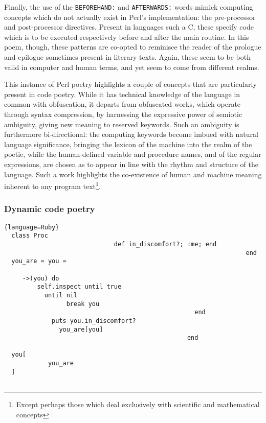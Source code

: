 \documentclass{article}
\begin{document}
Finally, the use of the \lstinline{BEFOREHAND:} and \lstinline{AFTERWARDS:} words mimick computing concepts which do not actually exist in Perl's implementation: the pre-processor and post-processor directives. Present in languages such a C, these specify code which is to be executed respectively before and after the main routine. In this poem, though, these patterns are co-opted to reminisce the reader of the prologue and epilogue sometimes present in literary texts. Again, these seem to be both valid in computer and human terms, and yet seem to come from different realms.

This instance of Perl poetry highlights a couple of concepts that are particularly present in code poetry. While it has technical knowledge of the language in common with obfuscation, it departs from obfuscated works, which operate through syntax compression, by harnessing the expressive power of semiotic ambiguity, giving new meaning to reserved keywords. Such an ambiguity is furthermore bi-directional: the computing keywords become imbued with natural language significance, bringing the lexicon of the machine into the realm of the poetic, while the human-defined variable and procedure names, and of the regular expressions, are chosen as to appear in line with the rhythm and structure of the language. Such a work highlights the co-existence of human and machine meaning inherent to any program text\footnote{Except perhaps those which deal exclusively with scientific and mathematical concepts}.

\pagebreak

\subsubsection{Dynamic code poetry}

\linespread{1.00}\selectfont
\begin{lstlisting}{language=Ruby}
  class Proc
                              def in_discomfort?; :me; end
                                                                  end
  you_are = you = 
     
     ->(you) do
         self.inspect until true
           until nil
                 break you
                                                    end
             puts you.in_discomfort?
               you_are[you]
                                                  end
  
  you[
            you_are
  ]
  
\end{lstlisting}
\linespread{1.50}\selectfont
\normalfont
\end{document}
